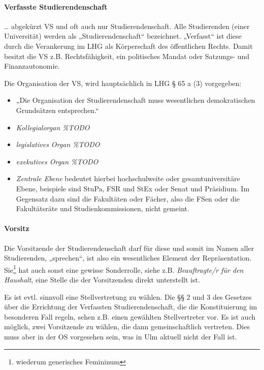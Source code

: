 \documentclass[
10pt,
a4paper,
twoside,								%
titlepage=false,							%
draft=false								%
]{scrartcl}
\begin{document}
\paragraph{Verfasste Studierendenschaft}

… abgekürzt VS und oft auch nur Studierendenschaft. Alle Studierenden (einer Universität) werden als „Studierendenschaft“ bezeichnet. „Verfasst“ ist diese durch die Verankerung im LHG als Körperschaft des öffentlichen Rechts. Damit besitzt die VS z.B. Rechtsfähigkeit, ein politisches Mandat oder Satzungs- und Finanzautonomie.


Die Organisation der VS, wird hauptsächlich in LHG § 65 a (3) vorgegeben:
\begin{itemize}
	\item „Die Organisation der Studierendenschaft muss wesentlichen demokratischen Grundsätzen entsprechen.“
	\item \emph{Kollegialorgan} \textit{\%TODO}
	\item \emph{legislatives Organ} \textit{\%TODO}
	\item \emph{exekutives Organ} \textit{\%TODO}
	\item \emph{Zentrale Ebene} bedeutet hierbei hochschulweite oder gesamtuniversitäre Ebene, beispiele sind StuPa, FSR und StEx oder Senat und Präsidium. Im Gegensatz dazu sind die Fakultäten oder Fächer, also die FSen oder die Fakultätsräte und Studienkommissionen, nicht gemeint.
\end{itemize}



\paragraph{Vorsitz}

Die Vorsitzende der Studierendenschaft darf für diese und somit im Namen aller Studierenden, „sprechen“, ist also ein wesentliches Element der Repräsentation. Sie\footnote{wiederum generisches Femininum} hat auch sonst eine gewisse Sonderrolle, siehe z.B. \emph{Beauftragte/r für den Haushalt}, eine Stelle die der Vorsitzenden direkt unterstellt ist.

Es ist evtl. sinnvoll eine Stellvertretung zu wählen. Die §§ 2 und 3 des Gesetzes über die Errichtung der Verfassten Studierendenschaft, die die Konstituierung im besonderen Fall regeln, sehen z.B. einen gewählten Stellvertreter vor. Es ist auch möglich, zwei Vorsitzende zu wählen, die dann gemeinschaftlich vertreten. Dies muss aber in der OS vorgesehen sein, was in Ulm aktuell nicht der Fall ist.
\end{document}
